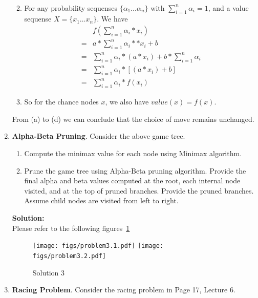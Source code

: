 \documentclass{article}
\begin{document}
\begin{enumerate}
\begin{enumerate}
\begin{equation}
\begin{aligned}
    \end{aligned}
    \end{equation}
    \item For any probability sequenses $\{\alpha_1\dots\alpha_n\}$ with $\sum\limits_{i=1}^{n}\alpha_i=1$, and a value sequense $X=\{x_1\dots x_n\}$. We have 
    \begin{equation}
        \begin{aligned}
        &f(\sum_{i=1}^{n}\alpha_i*x_i)\\
        =&a*\sum_{i=1}^{n}\alpha_i**x_i+b\\
        =&\sum_{i=1}^{n}\alpha_i*(a*x_i)+b*\sum_{i=1}^{n}\alpha_i\\
        =&\sum_{i=1}^{n}\alpha_i*[(a*x_i)+b]\\
        =&\sum_{i=1}^{n}\alpha_i*f(x_i)
        \end{aligned}
    \end{equation}
    \item So for the chance nodes $x$, we also have $value(x)=f(x)$. 
\end{enumerate}
From (a) to (d) we can conclude that the choice of move remains unchanged.
    \item \textbf{Alpha-Beta Pruning}.
    Consider the above game tree.
    \begin{enumerate}
        \item	Compute the minimax value for each node using Minimax algorithm.
        \item	Prune the game tree using Alpha-Beta pruning algorithm. Provide the final alpha and beta values computed at the root, each internal node visited, and at the top of pruned branches. Provide the pruned branches. Assume child nodes are visited from left to right.
    \end{enumerate}
    \textbf{Solution:}\\
    Please refer to the following figures~\ref{Solution3}
    \begin{figure}[h]
    	    \centering
    	    \texttt{[image: figs/problem3.1.pdf]}
    	    \texttt{[image: figs/problem3.2.pdf]}
    	    \caption{Solution 3}
    	    \label{Solution3}
    \end{figure}
    \item \textbf{Racing Problem}.
    	Consider the racing problem in Page 17, Lecture 6.
    	

\end{enumerate}
\end{document}
